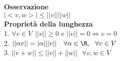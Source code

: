 \documentclass[12px]{article}
\theoremstyle{break}
\theoremstyle{break}
\theoremstyle{break}
\theoremstyle{break}
\theoremstyle{break}
\theoremstyle{break}
\theoremstyle{breal}
\begin{document}
\textbf{Osservazione}\\
$|<v,w>|\leq ||v||||w||$\\
\textbf{Proprietà della lunghezza}\\
1. $\forall v\in V \ \ ||v|| \geq 0$ e $||v|| = 0 \Leftrightarrow v = 0$\\
2. $||\alpha v|| = |\alpha| ||v||\ \ \ \forall \alpha\in \R, \ \ \forall v\in V$ \\
3. $||v+w|| \leq ||v|| + ||w|| \ \ \ \forall v,w\in V$
\end{document}
